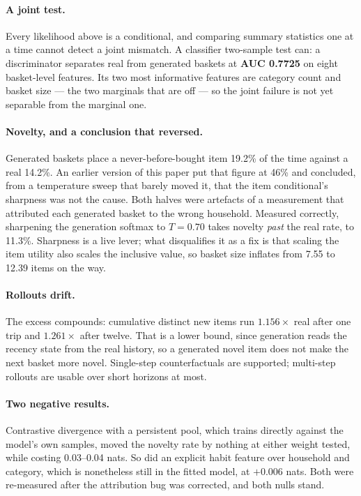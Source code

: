 \documentclass[11pt]{article}
\begin{document}
\paragraph{A joint test.} Every likelihood above is a conditional, and comparing summary
statistics one at a time cannot detect a joint mismatch. A classifier two-sample test can: a
discriminator separates real from generated baskets at \textbf{AUC 0.7725} on eight
basket-level features. Its two most informative features are category count and basket size
--- the two marginals that are off --- so the joint failure is not yet separable from the
marginal one.

\paragraph{Novelty, and a conclusion that reversed.} Generated baskets place a
never-before-bought item 19.2\% of the time against a real 14.2\%. An earlier version of this
paper put that figure at 46\% and concluded, from a temperature sweep that barely moved it,
that the item conditional's sharpness was not the cause. Both halves were artefacts of a
measurement that attributed each generated basket to the wrong household. Measured
correctly, sharpening the generation softmax to $T=0.70$ takes novelty \emph{past} the real
rate, to 11.3\%. Sharpness is a live lever; what disqualifies it as a fix is that scaling the
item utility also scales the inclusive value, so basket size inflates from 7.55 to 12.39
items on the way.

\paragraph{Rollouts drift.} The excess compounds: cumulative distinct new items run
$1.156\times$ real after one trip and $1.261\times$ after twelve. That is a lower bound,
since generation reads the recency state from the real history, so a generated novel item
does not make the next basket more novel. Single-step counterfactuals are supported;
multi-step rollouts are usable over short horizons at most.

\paragraph{Two negative results.} Contrastive divergence with a persistent pool, which
trains directly against the model's own samples, moved the novelty rate by nothing at
either weight tested, while costing 0.03--0.04 nats. So did an explicit habit feature over household and
category, which is nonetheless still in the fitted model, at $+0.006$ nats. Both were
re-measured after the attribution bug was corrected, and both nulls stand.
\end{document}
